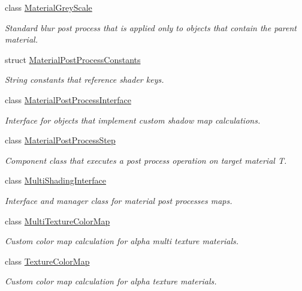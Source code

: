 \begin{DoxyCompactItemize}
class \mbox{\hyperlink{class_geometry_engine_1_1_custom_shading_1_1_material_grey_scale}{Material\+Grey\+Scale}}
\begin{DoxyCompactList}\small\item\em Standard blur post process that is applied only to objects that contain the parent material. \end{DoxyCompactList}\item 
struct \mbox{\hyperlink{struct_geometry_engine_1_1_custom_shading_1_1_material_post_process_constants}{Material\+Post\+Process\+Constants}}
\begin{DoxyCompactList}\small\item\em String constants that reference shader keys. \end{DoxyCompactList}\item 
class \mbox{\hyperlink{class_geometry_engine_1_1_custom_shading_1_1_material_post_process_interface}{Material\+Post\+Process\+Interface}}
\begin{DoxyCompactList}\small\item\em Interface for objects that implement custom shadow map calculations. \end{DoxyCompactList}\item 
class \mbox{\hyperlink{class_geometry_engine_1_1_custom_shading_1_1_material_post_process_step}{Material\+Post\+Process\+Step}}
\begin{DoxyCompactList}\small\item\em Component class that executes a post process operation on target material T. \end{DoxyCompactList}\item 
class \mbox{\hyperlink{class_geometry_engine_1_1_custom_shading_1_1_multi_shading_interface}{Multi\+Shading\+Interface}}
\begin{DoxyCompactList}\small\item\em Interface and manager class for material post processes maps. \end{DoxyCompactList}\item 
class \mbox{\hyperlink{class_geometry_engine_1_1_custom_shading_1_1_multi_texture_color_map}{Multi\+Texture\+Color\+Map}}
\begin{DoxyCompactList}\small\item\em Custom color map calculation for alpha multi texture materials. \end{DoxyCompactList}\item 
class \mbox{\hyperlink{class_geometry_engine_1_1_custom_shading_1_1_texture_color_map}{Texture\+Color\+Map}}
\begin{DoxyCompactList}\small\item\em Custom color map calculation for alpha texture materials. \end{DoxyCompactList}\end{DoxyCompactItemize}
